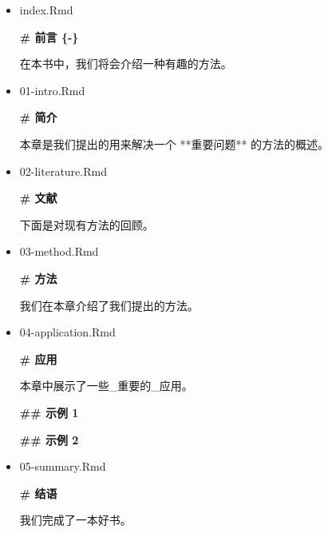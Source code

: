 \documentclass[
  12pt,
]{krantz}
\newenvironment{Shaded}{\begin{snugshade}}{\end{snugshade}}
\newcommand{\FunctionTok}[1]{\textcolor[rgb]{0.13,0.29,0.53}{\textbf{#1}}}
\newcommand{\NormalTok}[1]{#1}
\theoremstyle{definition}
\theoremstyle{definition}
\theoremstyle{definition}
\theoremstyle{definition}
\theoremstyle{remark}
\begin{document}
\begin{itemize}
\item
  index.Rmd

\begin{Shaded}
\begin{Highlighting}[]
\FunctionTok{\# 前言 \{{-}\}}

\NormalTok{在本书中，我们将会介绍一种有趣的方法。}
\end{Highlighting}
\end{Shaded}
\item
  01-intro.Rmd

\begin{Shaded}
\begin{Highlighting}[]
\FunctionTok{\# 简介}

\NormalTok{本章是我们提出的用来解决一个 **重要问题** 的方法的概述。}
\end{Highlighting}
\end{Shaded}
\item
  02-literature.Rmd

\begin{Shaded}
\begin{Highlighting}[]
\FunctionTok{\# 文献}

\NormalTok{下面是对现有方法的回顾。}
\end{Highlighting}
\end{Shaded}
\item
  03-method.Rmd

\begin{Shaded}
\begin{Highlighting}[]
\FunctionTok{\# 方法}

\NormalTok{我们在本章介绍了我们提出的方法。}
\end{Highlighting}
\end{Shaded}
\item
  04-application.Rmd

\begin{Shaded}
\begin{Highlighting}[]
\FunctionTok{\# 应用}

\NormalTok{本章中展示了一些\_重要的\_应用。}

\FunctionTok{\#\# 示例 1}

\FunctionTok{\#\# 示例 2}
\end{Highlighting}
\end{Shaded}
\item
  05-summary.Rmd

\begin{Shaded}
\begin{Highlighting}[]
\FunctionTok{\# 结语}

\NormalTok{我们完成了一本好书。}
\end{Highlighting}
\end{Shaded}
\end{itemize}
\end{document}
